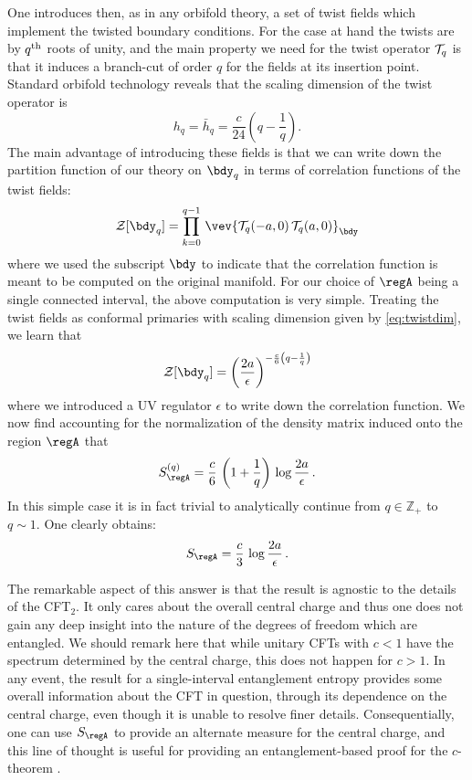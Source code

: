 \documentclass[12pt,openany]{book}
\begin{document}
One introduces then,  as in any orbifold theory, a set of twist fields which implement the twisted boundary conditions. For the case at hand the twists are by $q^{\rm th}$ roots of unity, and the main property we need for the twist operator ${\cal T}_q$ is that it induces a branch-cut of order $q$ for the fields at its insertion point. Standard orbifold technology reveals that the scaling dimension of the twist operator is
%
\begin{equation}
h_q = {\bar h}_q = \frac{c}{24} \left(q - \frac{1}{q}\right) .
\label{eq:twistdim}
\end{equation}
%
The main advantage of introducing these fields is that we can write down the partition function of our theory on $\bdy_q$ in terms of correlation functions of the twist fields:
%
\begin{equation}
\mathcal{Z}[\bdy_q]  = \prod_{k=0}^{q-1} \, \vev{{\cal T}_q(-a,0)\, {\cal T}_q(a,0)}_\bdy
\label{eq:Ztwist}
\end{equation}
%
where we used the subscript $\bdy$ to indicate that the correlation function is meant to be computed on the original manifold. For our choice of $\regA$ being a single connected interval, the above computation is very simple. Treating the twist fields as conformal primaries with scaling dimension given by \eqref{eq:twistdim}, we learn that
%
\begin{equation}
\mathcal{Z}[\bdy_q] =\left(\frac{2a}{\epsilon}\right)^{-\frac{c}{6} \left(q- \frac{1}{q}\right)}
\end{equation}
%
where we introduced a UV regulator $\epsilon$ to write down the correlation function. We now find accounting for the normalization of the density matrix induced onto the region $\regA$ that
%
\begin{equation}
S_\regA^{(q)} =   \frac{c}{6}\, \left(1 + \frac{1}{q}\right)\, \log\frac{2a}{\epsilon} \,.
\label{}
\end{equation}
%
In this simple case it is in fact trivial to analytically continue from $q \in {\mathbb Z}_+$ to $q\sim 1$. One clearly obtains:
%
\begin{equation}
S_\regA = \frac{c}{3} \, \log\frac{2a}{\epsilon} \,.
\label{eq:hlwcc}
\end{equation}
%

The remarkable aspect of this answer is that the result is agnostic to the details of the CFT$_2$. It only cares about the overall central charge and thus one does not gain any deep insight into the nature of the degrees of freedom which are entangled. We should remark here that while unitary CFTs with $c<1$ have the spectrum determined  by the central charge, this does not happen for $c> 1$. In any event, the result for a single-interval entanglement entropy provides some overall information about the CFT in question, through its dependence on the central charge, even though it is unable to resolve finer details. Consequentially, one can use $S_\regA$ to provide an alternate measure for the central charge, and this line of thought is useful for providing an entanglement-based proof for the $c$-theorem \cite{Casini:2004bw}.
\end{document}
